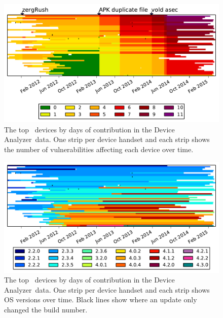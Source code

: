 \documentclass{llncs}
\newcommand{\da}{Device Analyzer}
\begin{document}
{
\begin{figure}[t]
\centering
\includegraphics[width=\columnwidth]{figures/device-data-all-security}
\caption{The top \daNumDeviceDataDevices\ devices by days of contribution in the \da\ data. One strip per device handset and each strip shows the number of vulnerabilities affecting each device over time.}
\label{fig:device_data_security}
\end{figure}
}

{
\begin{figure}[t]
\centering
\includegraphics[width=\columnwidth]{figures/device-data-all-os}
\caption{The top \daNumDeviceDataDevices\ devices by days of contribution in the \da\ data. One strip per device handset and each strip shows OS versions over time. Black lines show where an update only changed the build number.}
\label{fig:device_data_os}
\end{figure}
}
\end{document}
